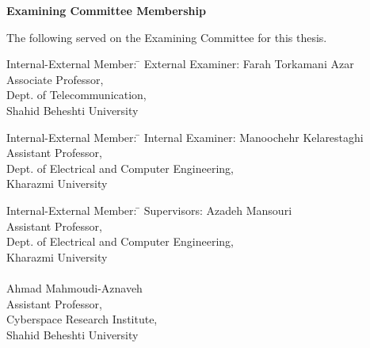 \cleardoublepage %

 
\begin{center}\textbf{Examining Committee Membership}\end{center}
  \noindent
The following served on the Examining Committee for this thesis.
  \bigskip
  
  \noindent
\begin{tabbing}
Internal-External Member: \=  \kill %
External Examiner: \>  Farah Torkamani Azar \\ 
\> Associate Professor, \\ \>Dept. of Telecommunication, \\ \>Shahid Beheshti University \\
\end{tabbing} 
  \bigskip
 \noindent
  \begin{tabbing}
Internal-External Member: \=  \kill %
Internal Examiner: \> Manoochehr Kelarestaghi \\
\> Assistant Professor, \\ \>Dept. of Electrical and Computer Engineering, \\ \>Kharazmi University \\
\end{tabbing}
  \bigskip
  
  \noindent
\begin{tabbing}
Internal-External Member: \=  \kill %
Supervisors: \> Azadeh Mansouri \\
\> Assistant Professor, \\ \>Dept. of Electrical and Computer Engineering,\\ \> Kharazmi University \\ \\
\> Ahmad Mahmoudi-Aznaveh \\
\> Assistant Professor, \\ \>Cyberspace Research Institute,\\ \> Shahid Beheshti University \\
\end{tabbing}
  

